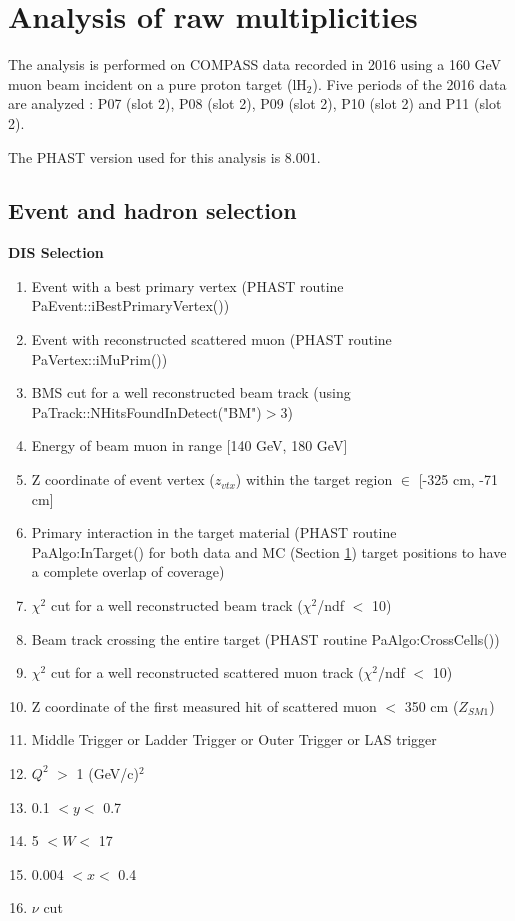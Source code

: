 \documentclass[letterpaper,12pt]{article}
\begin{document}
\section{Analysis of raw multiplicities} \label{Raw}

The analysis is performed on COMPASS data recorded in 2016 using a 160 GeV muon beam incident on a pure proton target (lH$_2$).
Five periods of the 2016 data are analyzed : P07 (slot 2), P08 (slot 2), P09 (slot 2), P10 (slot 2) and P11 (slot 2).

The PHAST version used for this analysis is 8.001.

\subsection{Event and hadron selection}

\hfill
\newline

\textbf{DIS Selection}
\begin{enumerate}
	\item Event with a best primary vertex (PHAST routine PaEvent::iBestPrimaryVertex())
	\item Event with reconstructed scattered muon (PHAST routine PaVertex::iMuPrim())
	\item BMS cut for a well reconstructed beam track (using PaTrack::NHitsFoundInDetect("BM")$>$3)
	\item Energy of beam muon in range [140 GeV, 180 GeV]
	\item Z coordinate of event vertex ($z_{vtx}$) within the target region $\in$ [-325 cm, -71 cm]
	\item Primary interaction in the target material (PHAST routine PaAlgo:InTarget() for both data and MC (Section \ref{Raw}) target positions
				to have a complete overlap of coverage)
	\item $\chi^2$ cut for a well reconstructed beam track ($\chi^2$/ndf $<$ 10)
	\item Beam track crossing the entire target (PHAST routine PaAlgo:CrossCells())
	\item $\chi^2$ cut for a well reconstructed scattered muon track ($\chi^2$/ndf $<$ 10)
	\item Z coordinate of the first measured hit of scattered muon $<$ 350 cm ($Z_{SM1}$)
	\item Middle Trigger or Ladder Trigger or Outer Trigger or LAS trigger
	\item $Q^2$ $>$ 1 (GeV/c)$^2$
	\item 0.1 $< y <$ 0.7
	\item 5 $< W <$ 17
	\item 0.004 $< x <$ 0.4
	\item $\nu$ cut
\end{enumerate}
\end{document}
